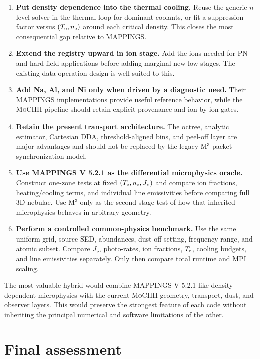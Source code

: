 \documentclass[english,a4paper]{my_memo}
\newcommand{\MoCHII}{\textsc{MoCHII}}
\newcommand{\Mthree}{M$^3$}
\newcommand{\Mappings}{MAPPINGS V 5.2.1}
\newcommand{\Te}{T_{\rm e}}
\newcommand{\nelec}{n_{\rm e}}
\begin{document}
\begin{enumerate}[leftmargin=2em]
\item \textbf{Put density dependence into the thermal cooling.}  Reuse the
  generic $n$-level solver in the thermal loop for dominant coolants, or fit
  a suppression factor versus $(\Te,\nelec)$ around each critical density.
  This closes the most consequential gap relative to MAPPINGS.
\item \textbf{Extend the registry upward in ion stage.}  Add the ions needed
  for PN and hard-field applications before adding marginal new low stages.
  The existing data-operation design is well suited to this.
\item \textbf{Add Na, Al, and Ni only when driven by a diagnostic need.}
  Their MAPPINGS implementations provide useful reference behavior, while
  the \MoCHII{} pipeline should retain explicit provenance and ion-by-ion
  gates.
\item \textbf{Retain the present transport architecture.}  The octree,
  analytic estimator, Cartesian DDA, threshold-aligned bins, and peel-off
  layer are major advantages and should not be replaced by the legacy
  \Mthree{} packet synchronization model.
\item \textbf{Use \Mappings{} as the differential microphysics oracle.}
  Construct one-zone tests at fixed $(\Te,\nelec,J_\nu)$ and compare ion
  fractions, heating/cooling terms, and individual line emissivities before
  comparing full 3D nebulae.  Use \Mthree{} only as the second-stage test
  of how that inherited microphysics behaves in arbitrary geometry.
\item \textbf{Perform a controlled common-physics benchmark.}  Use the same
  uniform grid, source SED, abundances, dust-off setting, frequency range,
  and atomic subset.  Compare $J_\nu$, photo-rates, ion fractions, $\Te$,
  cooling budgets, and line emissivities separately.  Only then compare
  total runtime and MPI scaling.
\end{enumerate}

The most valuable hybrid would combine \Mappings{}-like density-dependent
microphysics with the current \MoCHII{} geometry, transport, dust, and
observer layers.  This would preserve the strongest feature of each code
without inheriting the principal numerical and software limitations of the
other.

\section{Final assessment}
\end{document}
